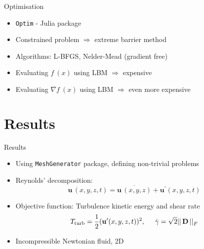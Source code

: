 \documentclass[aspectratio=169,xcolor=dvipsnames]{beamer}
\newcommand{\vect}[1]{\mathbf{#1}}
\begin{document}
\begin{frame}{Optimisation}
	\begin{itemize}
		\setlength\itemsep{1.4em}
		\item \texttt{Optim} - Julia package
		\item Constrained problem $\Rightarrow$ extreme barrier method
		\item Algorithms: L-BFGS, Nelder-Mead (gradient free)
		\item Evaluating $ f \ (x) $ using LBM $\Rightarrow$ \alert{expensive}
		\item Evaluating $ \nabla f \ (x) $ using LBM $\Rightarrow$ \alert{even more expensive}
	\end{itemize}
\end{frame}


\section{Results}
\begin{frame}{Results}
	\begin{itemize}
		\setlength\itemsep{1.4em}
		\item Using \texttt{MeshGenerator} package, defining non-trivial problems
		\item Reynolds' decomposition:
				$$ \vect{u} \,(x, y, z, t) = \overline{\vect{u} \,(x, y, z)} + \vect{u}^\prime(x, y, z, t) $$
		\item Objective function: Turbulence kinetic energy and shear rate
				$$ T_{\mathrm{turb}} = \frac{1}{2} (\vect{u}^\prime(x, y, z, t) )^2, \hspace{5mm} \dot{\gamma} = \sqrt{2} || \, \mathbf{D} \, ||^{}_{F}$$
		\item Incompressible Newtonian ﬂuid, 2D
	\end{itemize}
\end{frame}
\end{document}
